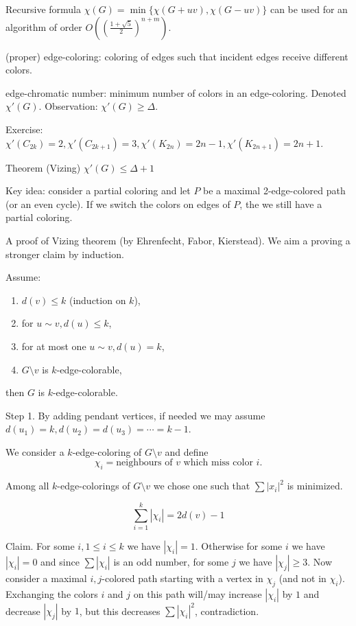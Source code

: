 \documentclass[12pt,a4paper]{article}
\begin{document}
Recursive formula \(\chi(G)=\min\{\chi(G+uv), \chi(G-uv)\}\) can be used for an
algorithm of order \(O\left({\left(\frac{1+\sqrt{5}}{2}\right)}^{n+m}\right)\).

(proper) edge-coloring: coloring of edges such that incident edges receive
different colors.

edge-chromatic number: minimum number of colors in an edge-coloring. Denoted
\(\chi'(G)\). Observation: \(\chi'(G) \geq \Delta\).

Exercise:
\(\chi'(C_{2k})=2, \chi'(C_{2k+1})=3, \chi'(K_{2n})=2n-1, \chi'(K_{2n+1})=2n+1\).

Theorem (Vizing) \(\chi'(G) \leq \Delta + 1\)

Key idea: consider a partial coloring and let \(P\) be a maximal 2-edge-colored
path (or an even cycle). If we switch the colors on edges of \(P\), the we still
have a partial coloring.

A proof of Vizing theorem (by Ehrenfecht, Fabor, Kierstead).  We aim a proving a
stronger claim by induction.

Assume: \begin{enumerate}
\item \(d(v) \leq k\) (induction on \(k\)),
\item for \(u \sim v, d(u) \leq k\),
\item for at most one \(u \sim v, d(u) = k\),
\item \(G \setminus v\) is \(k\)-edge-colorable,
\end{enumerate} then \(G\) is \(k\)-edge-colorable.

Step 1. By adding pendant vertices, if needed we may assume \(d(u_1) = k, d(u_2)
= d(u_3) =\cdots = k - 1\).

We consider a \(k\)-edge-coloring of \(G \setminus v\) and define
\[\chi_i = {\text{neighbours of } v \text{ which miss color } i}.\]

Among all \(k\)-edge-colorings of \(G\setminus v\) we chose one such that
\(\sum{|x_i|}^2\) is minimized.

\[\sum_{i=1}^k|\chi_i| = 2d(v)-1\]

Claim. For some \(i, 1 \leq i \leq k\) we have \(|\chi_i| = 1\). Otherwise for
some \(i\) we have \(|\chi_i| = 0\) and since \(\sum|\chi_i|\) is an odd number,
for some \(j\) we have \(|\chi_j| \geq 3\). Now consider a maximal
\({i, j}\)-colored path starting with a vertex in \(\chi_j\) (and not in
\(\chi_i\)).  Exchanging the colors \(i\) and \(j\) on this path will/may
increase \(|\chi_i|\) by \(1\) and decrease \(|\chi_j|\) by \(1\), but this
decreases \(\sum{|\chi_i|}^2\), contradiction.
\end{document}
